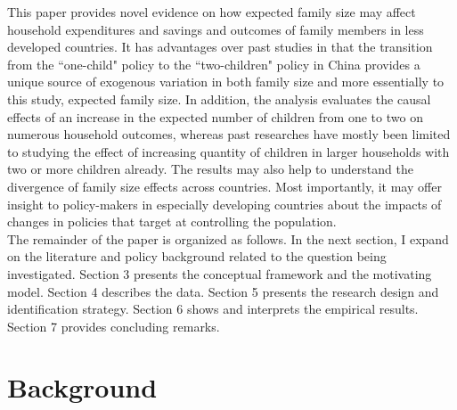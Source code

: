 \documentclass[12pt]{extarticle}
\begin{document}
\indent This paper provides novel evidence on how expected family size may affect household expenditures and savings and outcomes of family members in less developed countries. It has advantages over past studies in that the transition from the ``one-child" policy to the ``two-children" policy in China provides a unique source of exogenous variation in both family size and more essentially to this study, expected family size. In addition, the analysis evaluates the causal effects of an increase in the expected number of children from one to two on numerous household outcomes, whereas past researches have mostly been limited to studying the effect of increasing quantity of children in larger households with two or more children already. The results may also help to understand the divergence of family size effects across countries. Most importantly, it may offer insight to policy-makers in especially developing countries about the impacts of changes in policies that target at controlling the population. \\
\indent The remainder of the paper is organized as follows. In the next section, I expand on the literature and policy background related to the question being investigated. Section 3 presents the conceptual framework and the motivating model. Section 4 describes the data. Section 5 presents the research design and identification strategy. Section 6 shows and interprets the empirical results. Section 7 provides concluding remarks.

\section{Background}
\end{document}
